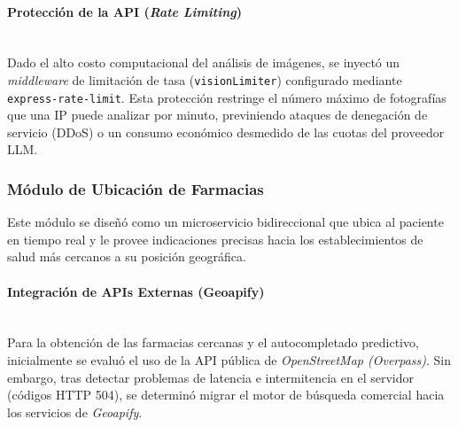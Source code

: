\paragraph{Protección de la API (\emph{Rate Limiting})}\leavevmode \\
Dado el alto costo computacional del análisis de imágenes, se inyectó un \emph{middleware} de limitación de tasa (\texttt{visionLimiter}) configurado mediante \texttt{express-rate-limit}. Esta protección restringe el número máximo de fotografías que una IP puede analizar por minuto, previniendo ataques de denegación de servicio (DDoS) o un consumo económico desmedido de las cuotas del proveedor LLM.


\subsubsection{Módulo de Ubicación de Farmacias }

Este módulo se diseñó como un microservicio bidireccional que ubica al paciente en tiempo real y le provee indicaciones precisas hacia los establecimientos de salud más cercanos a su posición geográfica.

\paragraph{Integración de APIs Externas (Geoapify)}\leavevmode \\
Para la obtención de las farmacias cercanas y el autocompletado predictivo, inicialmente se evaluó el uso de la API pública de \emph{OpenStreetMap (Overpass)}. Sin embargo, tras detectar problemas de latencia e intermitencia en el servidor (códigos HTTP 504), se determinó migrar el motor de búsqueda comercial hacia los servicios de \emph{Geoapify}. 

